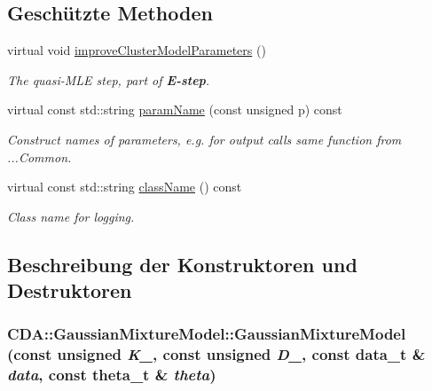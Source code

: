 \subsection*{Geschützte Methoden}
\begin{DoxyCompactItemize}
\item 
virtual void \hyperlink{classCDA_1_1GaussianMixtureModel_afe0080d43eb7169d66e57d074f1b7efc}{improveClusterModelParameters} ()
\begin{DoxyCompactList}\small\item\em The quasi-\/MLE step, part of {\bfseries E-\/step}. \item\end{DoxyCompactList}\item 
\hypertarget{classCDA_1_1GaussianMixtureModel_ace9d6f0ae0c45734c78be74b2c15d36b}{
virtual const std::string \hyperlink{classCDA_1_1GaussianMixtureModel_ace9d6f0ae0c45734c78be74b2c15d36b}{paramName} (const unsigned p) const }
\label{classCDA_1_1GaussianMixtureModel_ace9d6f0ae0c45734c78be74b2c15d36b}

\begin{DoxyCompactList}\small\item\em Construct names of parameters, e.g. for output calls same function from ...Common. \item\end{DoxyCompactList}\item 
virtual const std::string \hyperlink{classCDA_1_1GaussianMixtureModel_aec72323935694359e18e3363ceaa40e7}{className} () const 
\begin{DoxyCompactList}\small\item\em Class name for logging. \item\end{DoxyCompactList}\end{DoxyCompactItemize}


\subsection{Beschreibung der Konstruktoren und Destruktoren}
\hypertarget{classCDA_1_1GaussianMixtureModel_a4ed542a3d6838511b11d22560f7dc9b4}{
\subsubsection[{GaussianMixtureModel}]{\setlength{\rightskip}{0pt plus 5cm}CDA::GaussianMixtureModel::GaussianMixtureModel (const unsigned {\em K\_\-}, \/  const unsigned {\em D\_\-}, \/  const {\bf data\_\-t} \& {\em data}, \/  const {\bf theta\_\-t} \& {\em theta})}}
\label{classCDA_1_1GaussianMixtureModel_a4ed542a3d6838511b11d22560f7dc9b4}


